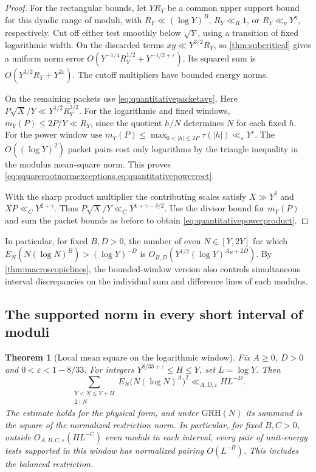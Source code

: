 \documentclass[11pt,a4paper]{article}
\numberwithin{equation}{section}
\newtheorem{theorem}{Theorem}[section]
\newcommand{\grh}{\mathrm{GRH}}
\begin{document}
\begin{proof}
For the rectangular bounds, let $Y R_Y$ be a common
upper support bound for this dyadic range of moduli,
with $R_Y\ll (\log Y)^B$, $R_Y\ll_R1$, or
$R_Y\ll_\eta Y^\eta$, respectively.
Cut off either test smoothly below $\sqrt Y$, using
a transition of fixed logarithmic width.
On the discarded terms $xy\ll Y^{3/2}R_Y$, so
\cref{thm:subcritical} gives a uniform norm error
$O(Y^{-1/4}R_Y^{1/2}+Y^{-1/2+\varepsilon})$.
Its squared sum is $O(Y^{1/2}R_Y+Y^{2\varepsilon})$.
The cutoff multipliers have bounded energy norms.

On the remaining packets use \cref{eq:quantitativepacketavg}.
Here $P\sqrt X/Y\ll Y^{1/2}R_Y^{3/2}$.
For the logarithmic and fixed windows,
$m_Y(P)\le 2P/Y\ll R_Y$, since the quotient $h/N$
determines $N$ for each fixed $h$.
For the power window use $m_Y(P)\le\max_{0<|h|\le2P}
\tau(|h|)\ll_\varepsilon Y^\varepsilon$.
The $O((\log Y)^2)$ packet pairs cost only logarithms
by the triangle inequality in the modulus mean-square
norm. This proves \cref{eq:squarerootnormexceptions,eq:quantitativepowerrect}.

With the sharp product multiplier the contributing
scales satisfy $X\gg Y^\delta$ and $XP\ll_C Y^{2+\gamma}$.
Thus $P\sqrt X/Y\ll_C Y^{1+\gamma-\delta/2}$.
Use the divisor bound for $m_Y(P)$ and sum the packet
bounds as before to obtain \cref{eq:quantitativepowerproduct}.
\end{proof}

In particular, for fixed $B,D>0$, the number of even
$N\in[Y,2Y]$ for which $E_N(N(\log N)^B)>(\log Y)^{-D}$
is $O_{B,D}(Y^{1/2}(\log Y)^{A_B+2D})$.
By \cref{thm:macroscopiclines}, the bounded-window version
also controls simultaneous interval discrepancies on the
individual sum and difference lines of each modulus.

\subsection{The supported norm in every short interval of moduli}

\begin{theorem}[Local mean square on the logarithmic window]
\label{thm:local-window-norm}
Fix $A\ge0$, $D>0$ and $0<\varepsilon<1-8/33$. For integers
$Y^{8/33+\varepsilon}\le H\le Y$, set $L=\log Y$. Then
\[
 \sum_{\substack{Y<N\le Y+H\\2\mid N}}
   E_N\bigl(N(\log N)^A\bigr)^2
     \ll_{A,D,\varepsilon} H L^{-D}.
\]
The estimate holds for the physical form, and under $\grh(N)$
its summand is the square of the normalized restriction norm.
In particular, for fixed $B,C>0$, outside $O_{A,B,C,\varepsilon}
(HL^{-C})$ even moduli in each interval, every pair of unit-energy
tests supported in this window has normalized pairing $O(L^{-B})$.
This includes the balanced restriction.
\end{theorem}
\end{document}
